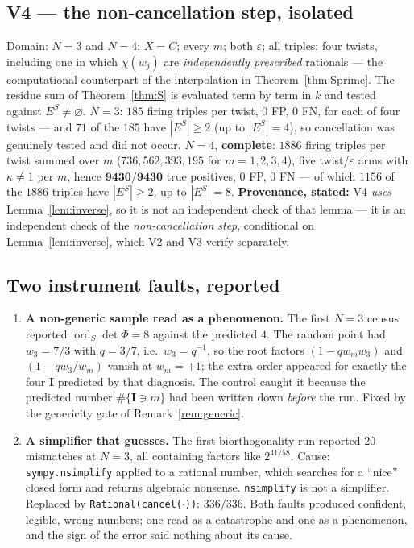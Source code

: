 \documentclass[11pt]{article}
\theoremstyle{definition}
\newcommand{\bI}{\mathbf{I}}
\newcommand{\ord}{\operatorname{ord}}
\newcommand{\ES}{E^{S}}
\begin{document}
\subsection*{V4 --- the non-cancellation step, isolated}
Domain: $N=3$ and $N=4$; $X=C$; every $m$; both
$\varepsilon$; all triples; four twists, including one in which $\chi(w_j)$ are
\emph{independently prescribed} rationals --- the computational counterpart of
the interpolation in Theorem~\ref{thm:Sprime}.  The residue sum of
Theorem~\ref{thm:S} is evaluated term by term in $k$ and tested against
$\ES\ne\varnothing$.  $N=3$: $185$ firing triples per twist, $0$ FP, $0$ FN, for
each of four twists --- and $71$ of the $185$ have $|\ES|\ge2$ (up to $|\ES|=4$),
so cancellation was genuinely tested and did not occur.  $N=4$, \textbf{complete}:
$1886$ firing triples per twist summed over $m$ ($736,562,393,195$ for
$m=1,2,3,4$), five twist/$\varepsilon$ arms with $\kappa\ne1$ per $m$, hence
$\mathbf{9430/9430}$ true positives, $0$ FP, $0$ FN --- of which $1156$ of the
$1886$ triples have $|\ES|\ge2$, up to $|\ES|=8$.
\textbf{Provenance, stated:} V4 \emph{uses} Lemma~\ref{lem:inverse}, so it is not
an independent check of that lemma --- it is an independent check of the
\emph{non-cancellation step}, conditional on Lemma~\ref{lem:inverse}, which V2
and V3 verify separately.

\subsection*{Two instrument faults, reported}
\begin{enumerate}
\item \textbf{A non-generic sample read as a phenomenon.}  The first $N=3$ census
  reported $\ord_S\det\Phi=8$ against the predicted $4$.  The random point had
  $w_3=7/3$ with $q=3/7$, i.e.\ $w_3=q^{-1}$, so the root factors
  $(1-qw_mw_3)$ and $(1-qw_3/w_m)$ vanish at $w_m=+1$; the extra order appeared
  for exactly the four $\bI$ predicted by that diagnosis.  The control caught it
  because the predicted number $\#\{\bI\ni m\}$ had been written down
  \emph{before} the run.  Fixed by the genericity gate of
  Remark~\ref{rem:generic}.
\item \textbf{A simplifier that guesses.}  The first biorthogonality run reported
  $20$ mismatches at $N=3$, all containing factors like $2^{41/58}$.  Cause:
  \texttt{sympy.nsimplify} applied to a rational number, which searches for a
  ``nice'' closed form and returns algebraic nonsense.  \texttt{nsimplify} is not
  a simplifier.  Replaced by \texttt{Rational(cancel($\cdot$))}: $336/336$.
  Both faults produced confident, legible, wrong numbers; one read as a
  catastrophe and one as a phenomenon, and the sign of the error said nothing
  about its cause.
\end{enumerate}
\end{document}
